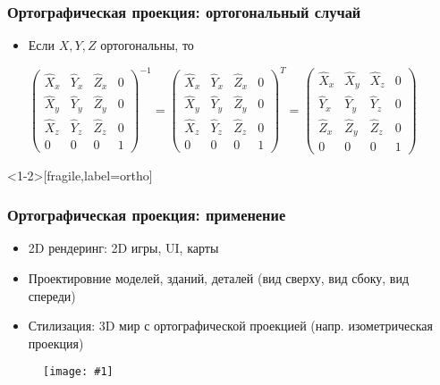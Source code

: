 \documentclass{beamer}
\newcommand{\slideimage}[1]{
  \begin{figure}
    \begin{adjustbox}{width=\textwidth, totalheight=\textheight-2\baselineskip-2\baselineskip,keepaspectratio}
      \texttt{[image: \#1]}
    \end{adjustbox}
  \end{figure}
}
\begin{document}
\begin{frame}[fragile]
\frametitle{Ортографическая проекция: ортогональный случай}
\begin{itemize}
\item Если \begin{math}X, Y, Z\end{math} ортогональны, то 
\begin{center}
\begin{math}
\begin{pmatrix}
\hat X_x & \hat Y_x & \hat Z_x & 0 \\
\hat X_y & \hat Y_y & \hat Z_y & 0 \\
\hat X_z & \hat Y_z & \hat Z_z & 0 \\
0 & 0 & 0 & 1
\end{pmatrix}^{-1}
=
\begin{pmatrix}
\hat X_x & \hat Y_x & \hat Z_x & 0 \\
\hat X_y & \hat Y_y & \hat Z_y & 0 \\
\hat X_z & \hat Y_z & \hat Z_z & 0 \\
0 & 0 & 0 & 1
\end{pmatrix}^T
=
\begin{pmatrix}
\hat X_x & \hat X_y & \hat X_z & 0 \\
\hat Y_x & \hat Y_y & \hat Y_z & 0 \\
\hat Z_x & \hat Z_y & \hat Z_z & 0 \\
0 & 0 & 0 & 1
\end{pmatrix}
\end{math}
\end{center}
\end{itemize}
\end{frame}

\begin{frame}<1-2>[fragile,label=ortho]
\frametitle{Ортографическая проекция: применение}
\begin{itemize}
\pause
\item 2D рендеринг: 2D игры, UI, карты
\pause
\item Проектировние моделей, зданий, деталей (вид сверху, вид сбоку, вид спереди)
\pause
\item Стилизация: 3D мир с ортографической проекцией (напр. изометрическая проекция)
\end{itemize}
\end{frame}

\begin{frame}
\slideimage{mario.jpg}
\end{frame}
\end{document}
